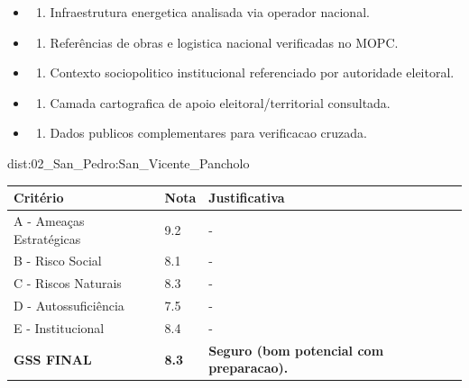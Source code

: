 {\begin{itemize}
\item
  \begin{enumerate}
  \def\labelenumi{\arabic{enumi})}
  \setcounter{enumi}{7}
  \tightlist
  \item
    Infraestrutura energetica analisada via operador nacional.
  \end{enumerate}
\item
  \begin{enumerate}
  \def\labelenumi{\arabic{enumi})}
  \setcounter{enumi}{8}
  \tightlist
  \item
    Referências de obras e logistica nacional verificadas no MOPC.
  \end{enumerate}
\item
  \begin{enumerate}
  \def\labelenumi{\arabic{enumi})}
  \setcounter{enumi}{9}
  \tightlist
  \item
    Contexto sociopolitico institucional referenciado por autoridade
    eleitoral.
  \end{enumerate}
\item
  \begin{enumerate}
  \def\labelenumi{\arabic{enumi})}
  \setcounter{enumi}{10}
  \tightlist
  \item
    Camada cartografica de apoio eleitoral/\allowbreak territorial consultada.
  \end{enumerate}
\item
  \begin{enumerate}
  \def\labelenumi{\arabic{enumi})}
  \setcounter{enumi}{11}
  \tightlist
  \item
    Dados publicos complementares para verificacao cruzada.
  \end{enumerate}
\end{itemize}}{dist:02_San_Pedro:San_Vicente_Pancholo}
\begin{table}[ht!]
\small \begin{tabular}{p{3.0cm}p{0.8cm}p{6.0cm}} \toprule
\textbf{Critério} & \textbf{Nota} & \textbf{Justificativa} \\ \midrule
A - Ameaças Estratégicas & 9.2 & - \\
B - Risco Social & 8.1 & - \\
C - Riscos Naturais & 8.3 & - \\
D - Autossuficiência & 7.5 & - \\
E - Institucional & 8.4 & - \\
\midrule \textbf{GSS FINAL} & \textbf{8.3} & \textbf{Seguro (bom potencial com preparacao).} \\ \bottomrule \end{tabular}
\end{table}
